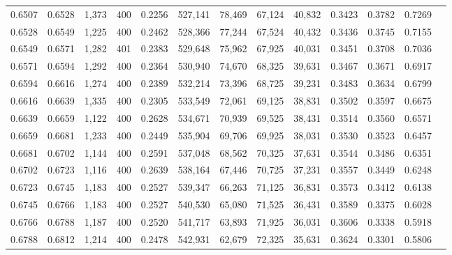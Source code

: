 \begin{tabular}{rrrrrrrrrrrrr}
0.6507 & 0.6528 &  1,373 & 400 &                                     0.2256 & 527,141 &  78,469 &  67,124 &  40,832 & 0.3423 & 0.3782 & 0.7269 \\
0.6528 & 0.6549 &  1,225 & 400 &                                     0.2462 & 528,366 &  77,244 &  67,524 &  40,432 & 0.3436 & 0.3745 & 0.7155 \\
0.6549 & 0.6571 &  1,282 & 401 &                                     0.2383 & 529,648 &  75,962 &  67,925 &  40,031 & 0.3451 & 0.3708 & 0.7036 \\
0.6571 & 0.6594 &  1,292 & 400 &                                     0.2364 & 530,940 &  74,670 &  68,325 &  39,631 & 0.3467 & 0.3671 & 0.6917 \\
0.6594 & 0.6616 &  1,274 & 400 &                                     0.2389 & 532,214 &  73,396 &  68,725 &  39,231 & 0.3483 & 0.3634 & 0.6799 \\
0.6616 & 0.6639 &  1,335 & 400 &                                     0.2305 & 533,549 &  72,061 &  69,125 &  38,831 & 0.3502 & 0.3597 & 0.6675 \\
0.6639 & 0.6659 &  1,122 & 400 &                                     0.2628 & 534,671 &  70,939 &  69,525 &  38,431 & 0.3514 & 0.3560 & 0.6571 \\
0.6659 & 0.6681 &  1,233 & 400 &                                     0.2449 & 535,904 &  69,706 &  69,925 &  38,031 & 0.3530 & 0.3523 & 0.6457 \\
0.6681 & 0.6702 &  1,144 & 400 &                                     0.2591 & 537,048 &  68,562 &  70,325 &  37,631 & 0.3544 & 0.3486 & 0.6351 \\
0.6702 & 0.6723 &  1,116 & 400 &                                     0.2639 & 538,164 &  67,446 &  70,725 &  37,231 & 0.3557 & 0.3449 & 0.6248 \\
0.6723 & 0.6745 &  1,183 & 400 &                                     0.2527 & 539,347 &  66,263 &  71,125 &  36,831 & 0.3573 & 0.3412 & 0.6138 \\
0.6745 & 0.6766 &  1,183 & 400 &                                     0.2527 & 540,530 &  65,080 &  71,525 &  36,431 & 0.3589 & 0.3375 & 0.6028 \\
0.6766 & 0.6788 &  1,187 & 400 &                                     0.2520 & 541,717 &  63,893 &  71,925 &  36,031 & 0.3606 & 0.3338 & 0.5918 \\
0.6788 & 0.6812 &  1,214 & 400 &                                     0.2478 & 542,931 &  62,679 &  72,325 &  35,631 & 0.3624 & 0.3301 & 0.5806 \\

\end{tabular}
